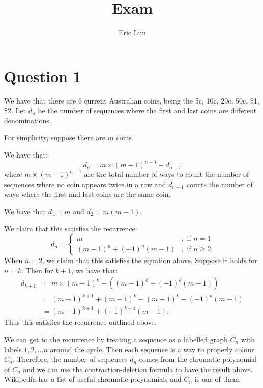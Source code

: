 \documentclass[]{article}
\title{Exam}
\author{Eric Luu}
\theoremstyle{definition}
\numberwithin{theorem}{section}
\numberwithin{equation}{section}
\begin{document}
\maketitle
\section{Question 1}
We have that there are $6$ current Australian coins, being the 5c, 10c, 20c, 50c, \$1, \$2. 
Let $d_n$ be the number of sequences where the first and last coins are different denominations.

For simplicity, suppose there are $m$ coins.

We have that:
\begin{equation}
	d_n = m \times (m - 1)^{n-1} - d_{n-1}
\end{equation}
where $m \times (m - 1)^{n-1}$ are the total number of ways to count the number of sequences where no coin appears twice in a row and $d_{n-1}$ counts the number of ways where the first and last coins are the same coin.

We have that $d_1 = m$ and $d_2 = m (m - 1)$. 

We claim that this satisfies the recurrence:
\begin{equation}
	d_n = \begin{cases}
		m &, \text{ if } n = 1\\
		(m -1)^n + (-1)^n (m - 1) &, \text{ if } n \geq 2
	\end{cases}
\end{equation}
When $n = 2$, we claim that this satisfies the equation above. Suppose it holds for $n = k$. Then for $k + 1$, we have that:
\begin{align*}
	d_{k + 1} &= m \times (m - 1)^{k} - ((m -1)^k + (-1)^k (m - 1))\\
	&= (m - 1)^{k + 1} + (m-1)^k - (m - 1)^k - (-1)^k (m - 1)\\
	&= (m - 1)^{k + 1} + (-1)^{k + 1}(m - 1).
\end{align*}
Thus this satisfies the recurrence outlined above.

We can get to the recurrence by treating a sequence as a labelled graph $C_n$ with labels $1, 2, ...n$ around the cycle. Then each sequence is a way to properly colour $C_n$. Therefore, the number of sequences $d_n$ comes from the chromatic polynomial of $C_n$ and we can use the contraction-deletion formula to have the result above. Wikipedia has a list of useful chromatic polynomials and $C_n$ is one of them.
\end{document}

